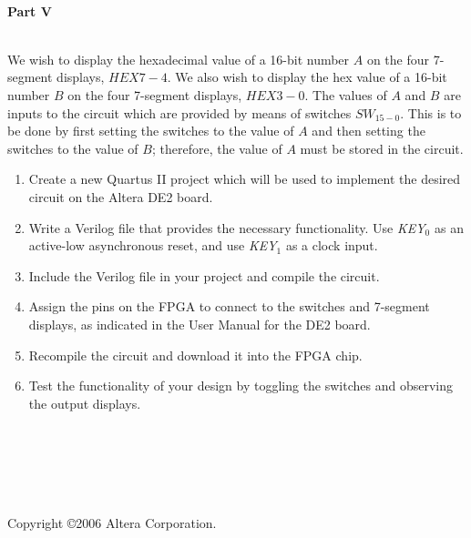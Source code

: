 \documentclass[epsfig,10pt,fullpage]{article}
\begin{document}
~\\
\noindent
{\bf Part V}

~\\
\noindent
We wish to display the hexadecimal value of a 16-bit number $A$
on the four 7-segment displays, $HEX7-4$.
We also wish to display the
hex value of a 16-bit number $B$ on the four 7-segment displays,
$HEX3-0$. The values of $A$ and $B$ are inputs to the circuit which are
provided by means of switches $SW_{15-0}$. 
This is to be done by first setting the switches to the value of $A$ and
then setting the switches to the value of $B$; therefore, the value of $A$
must be stored in the circuit.
\begin{enumerate}
\item Create a new Quartus II project which will be used to implement the desired
circuit on the Altera DE2 board.
\item Write a Verilog file that provides the necessary functionality. Use {\it KEY}$_0$ as
an active-low asynchronous reset, and use {\it KEY}$_1$ as a clock input.
\item Include the Verilog file in your project and compile the circuit.
\item Assign the pins on the FPGA to connect to the switches and 7-segment
displays, as indicated in the User Manual for the DE2 board.
\item Recompile the circuit and download it into the FPGA chip.
\item Test the functionality of your design by toggling the switches
and observing the output displays.
\end{enumerate}


~\\
~\\
~\\
~\\
~\\
Copyright \copyright 2006 Altera Corporation. 
\end{document}
